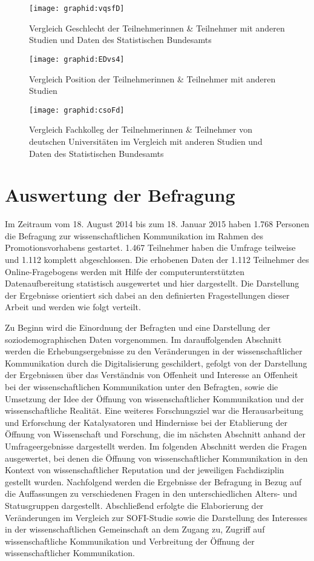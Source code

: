 \begin{figure}[h!]
\texttt{[image: graphid:vqsfD]}
\caption{Vergleich Geschlecht der Teilnehmerinnen & Teilnehmer mit anderen Studien und Daten des Statistischen Bundesamts}
\end{figure}

\begin{figure}[h!]
\texttt{[image: graphid:EDvs4]}
\caption{Vergleich Position der Teilnehmerinnen & Teilnehmer mit anderen Studien}
\end{figure}

\begin{figure}[h!]
\texttt{[image: graphid:csoFd]}
\caption{Vergleich Fachkolleg der Teilnehmerinnen & Teilnehmer von deutschen Universitäten im Vergleich mit anderen Studien und Daten des Statistischen Bundesamts}
\end{figure}

\section{Auswertung der Befragung}

Im Zeitraum vom 18. August 2014 bis zum 18. Januar 2015 haben 1.768 Personen die Befragung zur wissenschaftlichen Kommunikation im Rahmen des Promotionsvorhabens gestartet. 1.467 Teilnehmer haben die Umfrage teilweise und 1.112 komplett abgeschlossen. Die erhobenen Daten der 1.112 Teilnehmer des Online-Fragebogens werden mit Hilfe der computerunterstützten Datenaufbereitung statistisch ausgewertet und hier dargestellt. Die Darstellung der Ergebnisse orientiert sich dabei an den definierten Fragestellungen dieser Arbeit und werden wie folgt verteilt.

Zu Beginn wird die Einordnung der Befragten und eine Darstellung der soziodemographischen Daten vorgenommen. Im darauffolgenden Abschnitt werden die Erhebungsergebnisse zu den Veränderungen in der wissenschaftlicher Kommunikation durch die Digitalisierung geschildert, gefolgt von der Darstellung der Ergebnissen über das Verständnis von Offenheit und Interesse an Offenheit bei der wissenschaftlichen Kommunikation unter den Befragten, sowie die Umsetzung der Idee der Öffnung von wissenschaftlicher Kommunikation und der wissenschaftliche Realität. Eine weiteres Forschungsziel war die Herausarbeitung und Erforschung der Katalysatoren und Hindernisse bei der Etablierung der Öffnung von Wissenschaft und Forschung, die im nächsten Abschnitt anhand der Umfrageergebnisse dargestellt werden. Im folgenden Abschnitt werden die Fragen ausgewertet, bei denen die Öffnung von wissenschaftlicher Kommunikation in den Kontext von wissenschaftlicher Reputation und der jeweiligen Fachdisziplin gestellt wurden. Nachfolgend werden die Ergebnisse der Befragung in Bezug auf die Auffassungen zu verschiedenen Fragen in den unterschiedlichen Alters- und Statusgruppen dargestellt. Abschließend erfolgte die Elaborierung der Veränderungen im Vergleich zur SOFI-Studie sowie die  Darstellung des Interesses in der wissenschaftlichen Gemeinschaft an dem Zugang zu, Zugriff auf wissenschaftliche Kommunikation und Verbreitung der Öffnung der wissenschaftlicher Kommunikation.

